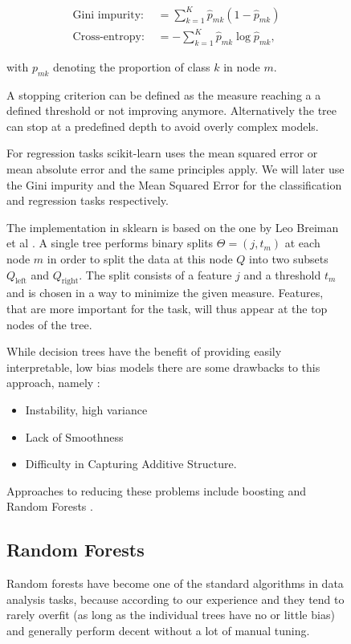 \begin{figure}
\begin{align}
	\text{Gini impurity: } &= \sum_{k=1}^K \hat{p}_{mk}(1-\hat{p}_{mk}) \\
	\text{Cross-entropy: } &= -\sum_{k=1}^K \hat{p}_{mk}\log{\hat{p}_{mk}},
  \label{eq:gini_ce}
\end{align}

with $p_{mk}$ denoting the proportion of class $k$ in node $m$.

A stopping criterion can be defined as the measure reaching a
a defined threshold or not improving anymore.
Alternatively the tree can stop at a predefined depth to
avoid overly complex models.

For regression tasks scikit-learn uses the mean squared error
or mean absolute error and the same principles apply.
We will later use the Gini impurity and the Mean Squared Error
for the classification and regression tasks respectively.

The implementation in sklearn is based on the one by
Leo Breiman et al \cite{breimanclassification}.
A single tree performs binary splits $\Theta = (j, t_m)$
at each node $m$ in order to split
the data at this node $Q$ into two subsets
$Q_\text{left}$
and
$Q_\text{right}$.
The split consists of a feature $j$ and a threshold $t_m$ and is
chosen in a way to minimize the given measure.
Features, that are more important for the task, will
thus appear at the top nodes of the tree.


While decision trees have the benefit of providing
easily interpretable, low bias models there are some drawbacks to this
approach, namely \cite{hastie2017springer}:
\begin{itemize}
  \item{Instability, high variance}
  \item{Lack of Smoothness}
  \item{Difficulty in Capturing Additive Structure}.
\end{itemize}

Approaches to reducing these problems include
boosting \cite{freund1997decision} and Random Forests \cite{Breiman2001}.

\subsection{Random Forests}

Random forests have become one of the standard algorithms
in data analysis tasks, because according to our
experience and \cite{hastie2017springer} they tend to
rarely overfit (as long as the individual trees have no or little bias)
and generally perform decent without a lot of manual tuning.


\end{figure}
